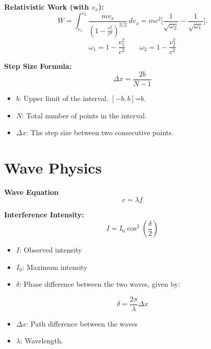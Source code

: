 \documentclass[a4paper,11pt]{article}
\renewcommand{\textbf}[1]{{\scriptsize	\bfseries #1}}
\begin{document}
\begin{footnotesize}
\begin{multicols}{2}
\begin{minipage}{\linewidth}

\textbf{Relativistic Work (with $v_x$):} \\[-0.2cm]
\[
W = \int_{v_1}^{v_2} \frac{m v_x }{\left( 1 - \frac{v_x^2}{c^2} \right)^{3/2}}\,dv_x  = mc^2 \Big[ \frac{1}{\sqrt{\omega_2}} - \frac{1}{\sqrt{\omega_1}} \Big].
\]
\[
 \omega_1 = 1 - \frac{v_1^2}{c^2} \quad \quad \omega_2 = 1 - \frac{v_2^2}{c^2}
\]

\end{minipage}
\begin{minipage}{\linewidth}
\textbf{Step Size Formula:}
\[
\Delta x = \frac{2b}{N - 1}
\]
\begin{itemize}
    \item $b$: Upper limit of the interval.  $[-b, b]$=$b$.
    \item $N$: Total number of points in the interval.
    \item $\Delta x$: The step size between two consecutive points.
\end{itemize}

\end{minipage}


\section*{Wave Physics}

\begin{minipage}{\linewidth}

\textbf{Wave Equation} \\[-0.2cm]
\[
c = \lambda f
\]

\end{minipage}

\begin{minipage}{\linewidth}

\textbf{Interference Intensity:} \\[-0.2cm]
\[
I = I_0 \cos^2\left(\frac{\delta}{2}\right)
\]
\begin{itemize}
    \item \(I\): Observed intensity
    \item \(I_0\): Maximum intensity
    \item \(\delta\): Phase difference between the two waves, given by:
\end{itemize}

\[
\delta = \frac{2\pi}{\lambda} \Delta x
\]
\begin{itemize}
    \item \(\Delta x\): Path difference between the waves
    \item \(\lambda\): Wavelength.
\end{itemize}


\end{minipage}
\end{multicols}
\end{footnotesize}
\end{document}

